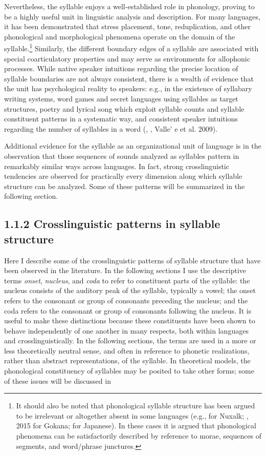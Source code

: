   Nevertheless, the syllable enjoys a well-established role in phonology, proving to be a highly useful unit in linguistic analysis and description. For many languages, it has been demonstrated that stress placement, tone, reduplication, and other phonological and morphological phenomena operate on the domain of the syllable.\footnote{ \textrm{It should also be noted that phonological syllable structure has been argued to be irrelevant or altogether absent in some languages (e.g., \citealt{Newman1947} for Nuxalk; \citealt{Hyman2011}, 2015 for Gokana; \citealt{Labrune2012} for Japanese). In these cases it is argued that phonological phenomena can be satisfactorily described by reference to morae, sequences of segments, and word/phrase junctures.}} Similarly, the different boundary edges of a syllable are associated with special coarticulatory properties and may serve as environments for allophonic processes. While native speaker intuitions regarding the precise location of syllable boundaries are not always consistent, there is a wealth of evidence that the unit has psychological reality to speakers: e.g., in the existence of syllabary writing systems, word games and secret languages using syllables as target structures, poetry and lyrical song which exploit syllable counts and syllable constituent patterns in a systematic way, and consistent speaker intuitions regarding the number of syllables in a word (\citealt{BellHooper1978}, \citealt{Blevins1995}, Valle\'{} e et al. 2009).

  Additional evidence for the syllable as an organizational unit of language is in the observation that those sequences of sounds analyzed as syllables pattern in remarkably similar ways across languages. In fact, strong crosslinguistic tendencies are observed for practically every dimension along which syllable structure can be analyzed. Some of these patterns will be summarized in the following section.

\subsection{1.1.2 Crosslinguistic patterns in syllable structure}

  Here I describe some of the crosslinguistic patterns of syllable structure that have been observed in the literature. In the following sections I use the descriptive terms \textit{onset}, \textit{nucleus}, and \textit{coda} to refer to constituent parts of the syllable: the nucleus consists of the auditory peak of the syllable, typically a vowel; the onset refers to the consonant or group of consonants preceding the nucleus; and the coda refers to the consonant or group of consonants following the nucleus. It is useful to make these distinctions because these constituents have been shown to behave independently of one another in many respects, both within languages and crosslinguistically. In the following sections, the terms are used in a more or less theoretically neutral sense, and often in reference to phonetic realizations, rather than abstract representations, of the syllable. In theoretical models, the phonological constituency of syllables may be posited to take other forms; some of these issues will be discussed in 

